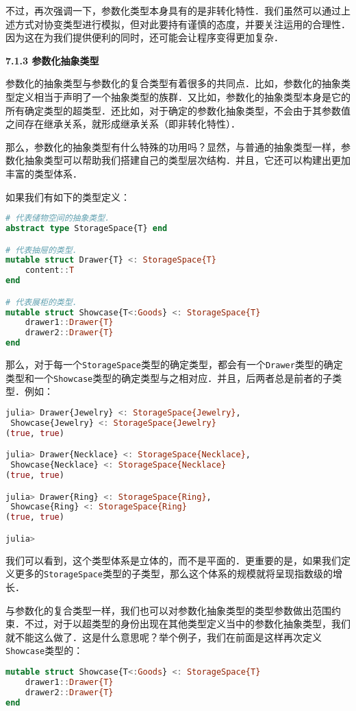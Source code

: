 不过，再次强调一下，参数化类型本身具有的是非转化特性．我们虽然可以通过上述方式对协变类型进行模拟，但对此要持有谨慎的态度，并要关注运用的合理性．因为这在为我们提供便利的同时，还可能会让程序变得更加复杂．

\textbf{7.1.3 参数化抽象类型}

参数化的抽象类型与参数化的复合类型有着很多的共同点．比如，参数化的抽象类型定义相当于声明了一个抽象类型的族群．又比如，参数化的抽象类型本身是它的所有确定类型的超类型．还比如，对于确定的参数化抽象类型，不会由于其参数值之间存在继承关系，就形成继承关系（即非转化特性）．

那么，参数化的抽象类型有什么特殊的功用吗？显然，与普通的抽象类型一样，参数化抽象类型可以帮助我们搭建自己的类型层次结构．并且，它还可以构建出更加丰富的类型体系．

如果我们有如下的类型定义：
\begin{lstlisting}[language=julia]
# 代表储物空间的抽象类型．
abstract type StorageSpace{T} end

# 代表抽屉的类型．
mutable struct Drawer{T} <: StorageSpace{T}
    content::T
end

# 代表展柜的类型．
mutable struct Showcase{T<:Goods} <: StorageSpace{T}
    drawer1::Drawer{T}
    drawer2::Drawer{T}
end
\end{lstlisting}

那么，对于每一个\verb|StorageSpace|类型的确定类型，都会有一个\verb|Drawer|类型的确定类型和一个\verb|Showcase|类型的确定类型与之相对应．并且，后两者总是前者的子类型．例如：
\begin{lstlisting}[language=julia]
julia> Drawer{Jewelry} <: StorageSpace{Jewelry},
 Showcase{Jewelry} <: StorageSpace{Jewelry}
(true, true)

julia> Drawer{Necklace} <: StorageSpace{Necklace},
 Showcase{Necklace} <: StorageSpace{Necklace}
(true, true)

julia> Drawer{Ring} <: StorageSpace{Ring},
 Showcase{Ring} <: StorageSpace{Ring}
(true, true)

julia> 
\end{lstlisting}

我们可以看到，这个类型体系是立体的，而不是平面的．更重要的是，如果我们定义更多的\verb|StorageSpace|类型的子类型，那么这个体系的规模就将呈现指数级的增长．

与参数化的复合类型一样，我们也可以对参数化抽象类型的类型参数做出范围约束．不过，对于以超类型的身份出现在其他类型定义当中的参数化抽象类型，我们就不能这么做了．这是什么意思呢？举个例子，我们在前面是这样再次定义\verb|Showcase|类型的：
\begin{lstlisting}[language=julia]
mutable struct Showcase{T<:Goods} <: StorageSpace{T}
    drawer1::Drawer{T}
    drawer2::Drawer{T}
end
\end{lstlisting}


